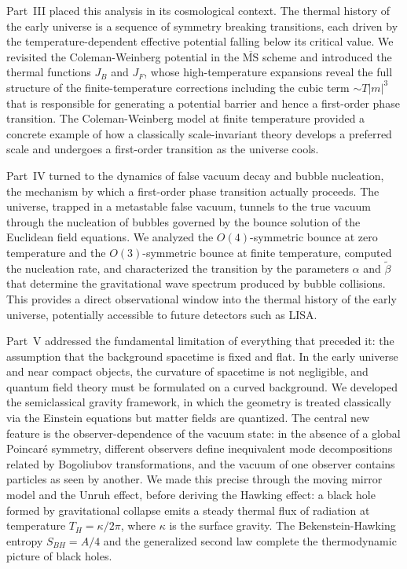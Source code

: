 Part~III placed this analysis in its cosmological context. The thermal
history of the early universe is a sequence of symmetry breaking
transitions, each driven by the temperature-dependent effective
potential falling below its critical value. We revisited the
Coleman-Weinberg potential in the $\overline{\text{MS}}$ scheme and
introduced the thermal functions $J_B$ and $J_F$, whose
high-temperature expansions reveal the full structure of the
finite-temperature corrections including the cubic term $\sim T|m|^3$
that is responsible for generating a potential barrier and hence a
first-order phase transition. The Coleman-Weinberg model at finite
temperature provided a concrete example of how a classically
scale-invariant theory develops a preferred scale and undergoes a
first-order transition as the universe cools.

Part~IV turned to the dynamics of false vacuum decay and bubble
nucleation, the mechanism by which a first-order phase transition
actually proceeds. The universe, trapped in a metastable false vacuum,
tunnels to the true vacuum through the nucleation of bubbles governed
by the bounce solution of the Euclidean field equations. We analyzed
the $O(4)$-symmetric bounce at zero temperature and the
$O(3)$-symmetric bounce at finite temperature, computed the nucleation
rate, and characterized the transition by the parameters $\alpha$ and
$\tilde\beta$ that determine the gravitational wave spectrum produced
by bubble collisions. This provides a direct observational window into
the thermal history of the early universe, potentially accessible to
future detectors such as LISA.

Part~V addressed the fundamental limitation of everything that preceded
it: the assumption that the background spacetime is fixed and flat. In
the early universe and near compact objects, the curvature of spacetime
is not negligible, and quantum field theory must be formulated on a
curved background. We developed the semiclassical gravity framework, in
which the geometry is treated classically via the Einstein equations
but matter fields are quantized. The central new feature is the
observer-dependence of the vacuum state: in the absence of a global
Poincar\'{e} symmetry, different observers define inequivalent mode
decompositions related by Bogoliubov transformations, and the vacuum
of one observer contains particles as seen by another. We made this
precise through the moving mirror model and the Unruh effect, before
deriving the Hawking effect: a black hole formed by gravitational
collapse emits a steady thermal flux of radiation at temperature
$T_H = \kappa/2\pi$, where $\kappa$ is the surface gravity. The
Bekenstein-Hawking entropy $S_{BH} = A/4$ and the generalized second
law complete the thermodynamic picture of black holes.

